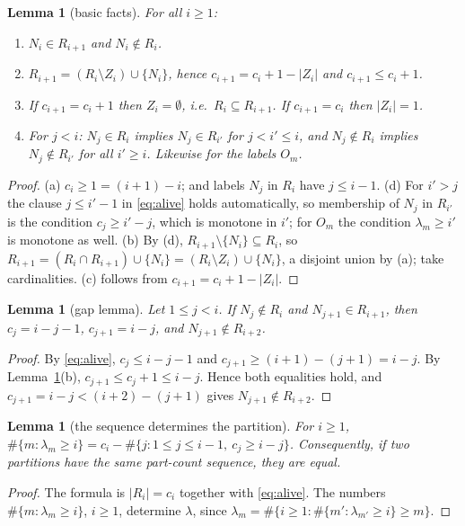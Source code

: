 \documentclass[11pt]{article}
\newtheorem{lemma}[theorem]{Lemma}
\theoremstyle{definition}
\newcommand{\R}{R}
\renewcommand{\le}{\leqslant}
\renewcommand{\ge}{\geqslant}
\begin{document}
\begin{lemma}[basic facts]\label{lem:basic}
For all $i\ge1$:
\begin{enumerate}
\item[(a)] $N_i\in \R_{i+1}$ and $N_i\notin \R_i$.
\item[(b)] $\R_{i+1}=(\R_i\setminus Z_i)\cup\{N_i\}$, hence $c_{i+1}=c_i+1-|Z_i|$ and $c_{i+1}\le c_i+1$.
\item[(c)] If $c_{i+1}=c_i+1$ then $Z_i=\emptyset$, i.e.\ $\R_i\subseteq \R_{i+1}$.  If $c_{i+1}=c_i$ then $|Z_i|=1$.
\item[(d)] For $j<i$: $N_j\in \R_i$ implies $N_j\in \R_{i'}$ for $j<i'\le i$, and $N_j\notin \R_i$ implies
$N_j\notin \R_{i'}$ for all $i'\ge i$.  Likewise for the labels $O_m$.
\end{enumerate}
\end{lemma}
\begin{proof}
(a) $c_i\ge1=(i+1)-i$; and labels $N_j$ in $\R_i$ have $j\le i-1$.  (d) For $i'>j$ the clause $j\le i'-1$ in
\eqref{eq:alive} holds automatically, so membership of $N_j$ in $\R_{i'}$ is the condition $c_j\ge i'-j$, which
is monotone in $i'$; for $O_m$ the condition $\lambda_m\ge i'$ is monotone as well.  (b) By (d), $\R_{i+1}\setminus\{N_i\}\subseteq \R_i$, so
$\R_{i+1}=(\R_i\cap \R_{i+1})\cup\{N_i\}=(\R_i\setminus Z_i)\cup\{N_i\}$, a disjoint union by (a); take cardinalities.
(c) follows from $c_{i+1}=c_i+1-|Z_i|$.
\end{proof}

\begin{lemma}[gap lemma]\label{lem:gap}
Let $1\le j<i$.  If $N_j\notin \R_i$ and $N_{j+1}\in \R_{i+1}$, then $c_j=i-j-1$, $c_{j+1}=i-j$, and
$N_{j+1}\notin \R_{i+2}$.
\end{lemma}
\begin{proof}
By \eqref{eq:alive}, $c_j\le i-j-1$ and $c_{j+1}\ge (i+1)-(j+1)=i-j$.  By Lemma~\ref{lem:basic}(b),
$c_{j+1}\le c_j+1\le i-j$.  Hence both equalities hold, and $c_{j+1}=i-j<(i+2)-(j+1)$ gives
$N_{j+1}\notin \R_{i+2}$.
\end{proof}

\begin{lemma}[the sequence determines the partition]\label{lem:determ}
For $i\ge1$, $\#\{m:\lambda_m\ge i\}=c_i-\#\{j:1\le j\le i-1,\ c_j\ge i-j\}$.  Consequently, if two partitions
have the same part-count sequence, they are equal.
\end{lemma}
\begin{proof}
The formula is $|\R_i|=c_i$ together with \eqref{eq:alive}.  The numbers $\#\{m:\lambda_m\ge i\}$, $i\ge1$,
determine $\lambda$, since $\lambda_m=\#\{i\ge1:\#\{m':\lambda_{m'}\ge i\}\ge m\}$.
\end{proof}
\end{document}
